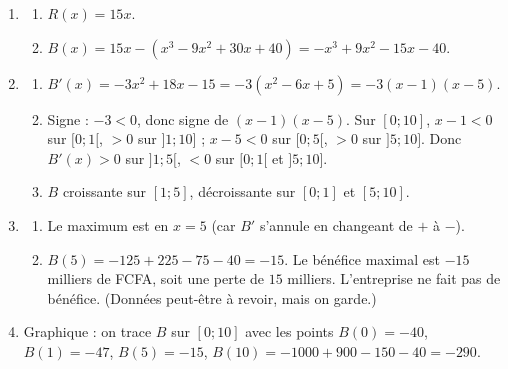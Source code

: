 \begin{enumerate}[label=\arabic*)]
\item 
\begin{enumerate}[label=\alph*)]
\item $R(x)=15x$.
\item $B(x)=15x-(x^3-9x^2+30x+40)=-x^3+9x^2-15x-40$.
\end{enumerate}
\item 
\begin{enumerate}[label=\alph*)]
\item $B'(x)=-3x^2+18x-15=-3(x^2-6x+5)=-3(x-1)(x-5)$.
\item Signe : $-3<0$, donc signe de $(x-1)(x-5)$. Sur $[0;10]$, $x-1<0$ sur $[0;1[$, $>0$ sur $]1;10]$ ; $x-5<0$ sur $[0;5[$, $>0$ sur $]5;10]$. Donc $B'(x)>0$ sur $]1;5[$, $<0$ sur $[0;1[$ et $]5;10]$.
\item $B$ croissante sur $[1;5]$, décroissante sur $[0;1]$ et $[5;10]$.
\end{enumerate}
\item 
\begin{enumerate}[label=\alph*)]
\item Le maximum est en $x=5$ (car $B'$ s'annule en changeant de $+$ à $-$).
\item $B(5)=-125+225-75-40=-15$. Le bénéfice maximal est $-15$ milliers de FCFA, soit une perte de $15$ milliers. L'entreprise ne fait pas de bénéfice. (Données peut-être à revoir, mais on garde.)
\end{enumerate}
\item Graphique : on trace $B$ sur $[0;10]$ avec les points $B(0)=-40$, $B(1)=-47$, $B(5)=-15$, $B(10)=-1000+900-150-40=-290$.
\end{enumerate}

